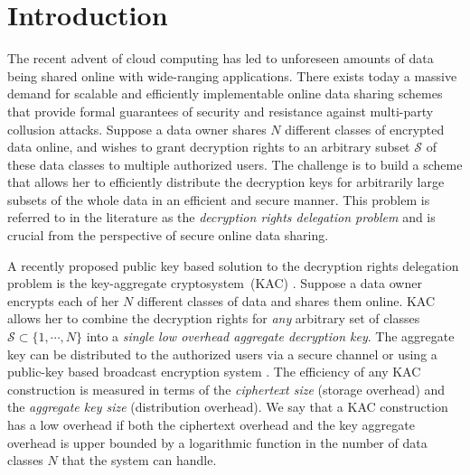 \section{Introduction}
\label{sec:Introduction}

The recent advent of cloud computing has led to unforeseen amounts of data being shared online with wide-ranging applications. There exists today a massive demand for scalable and efficiently implementable online data sharing schemes that provide formal guarantees of security and resistance against multi-party collusion attacks. Suppose a data owner shares $N$ different classes of encrypted data online, and wishes to grant decryption rights to an arbitrary subset $\mathcal{S}$ of these data classes to multiple authorized users. The challenge is to build a scheme that allows her to efficiently distribute the decryption keys for arbitrarily large subsets of the whole data in an efficient and secure manner. This problem is referred to in the literature as the \emph{decryption rights delegation problem} \cite{drago2012inside,chu2014key} and is crucial from the perspective of secure online data sharing.

A recently proposed public key based solution to the decryption rights delegation problem is the key-aggregate cryptosystem~(KAC) \cite{chu2014key,patranabis2015dynamic}. Suppose a data owner encrypts each of her $N$ different classes of data and shares them online. KAC allows her to combine the decryption rights for \emph{any} arbitrary set of classes $\mathcal{S}\subset\{1,\cdots,N\}$ into a \emph{single low overhead aggregate decryption key}. The aggregate key can be distributed to the authorized users via a secure channel or using a public-key based broadcast encryption system \cite{boneh2005collusion,boneh2014low}. The efficiency of any KAC construction is measured in terms of the \emph{ciphertext size} (storage overhead) and the \emph{aggregate key size} (distribution overhead). We say that a KAC construction has a low overhead if both the ciphertext overhead and the key aggregate overhead is upper bounded by a logarithmic function in the number of data classes $N$ that the system can handle.


